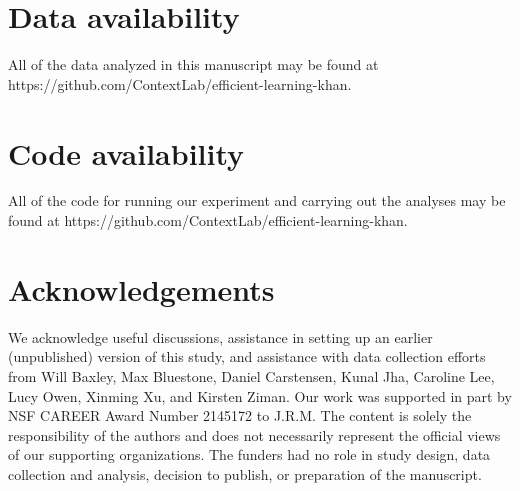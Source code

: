 \documentclass[10pt]{article}
\begin{document}
\section*{Data availability}

All of the data analyzed in this manuscript may be found at
https://github.com/Con\-text\-Lab/eff\-ic\-ient-learn\-ing-khan.

\section*{Code availability}

All of the code for running our experiment and carrying out the analyses may be
found at https://github.com/Con\-text\-Lab/eff\-ic\-ient-learn\-ing-khan.

\section*{Acknowledgements}

We acknowledge useful discussions, assistance in setting up an earlier
(unpublished) version of this study, and assistance with data collection
efforts from Will Baxley, Max Bluestone, Daniel Carstensen, Kunal Jha, Caroline
Lee, Lucy Owen, Xinming Xu, and Kirsten Ziman. Our work was supported in part
by NSF CAREER Award Number 2145172 to J.R.M. The content is solely the
responsibility of the authors and does not necessarily represent the official
views of our supporting organizations. The funders had no role in study design,
data collection and analysis, decision to publish, or preparation of the
manuscript.





\end{document}
